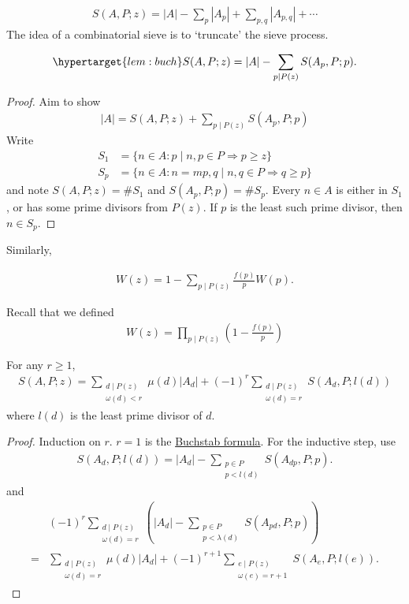 \documentclass{article}
\newcommand{\1}{\mathbbm{1}}
\begin{document}
\begin{align*}
  S(A,P;z) = |A| - \sum_p |A_p| + \sum_{p,q} |A_{p,q}| + \dotsb
\end{align*}
The idea of a combinatorial sieve is to `truncate' the sieve process.
\begin{lemma}
  \begin{equation*}
    \hypertarget{lem:buch} S(A,P;z) = |A| - \sum_{p \mid P(z)} S(A_p, P; p).
  \end{equation*}
\end{lemma}
\begin{proof}
  Aim to show
  \begin{align*}
    |A| = S(A,P;z) + \sum_{p \mid P(z)} S(A_p, P; p)
  \end{align*}
  Write
  \begin{align*}
    S_1 &= \{n \in A : p \mid n, p \in P \Rightarrow p \geq z\} \\
    S_p &= \{n \in A : n = mp, q \mid n, q \in P \Rightarrow q \geq p\}
  \end{align*}
  and note $S(A,P;z) = \# S_1$ and $S(A_p, P; p) = \# S_p$. Every $n \in A$ is either in $S_1$, or has some prime divisors from $P(z)$. If $p$ is the least such prime divisor, then $n \in S_p$.
\end{proof}
Similarly,
\begin{lemma}
  \begin{align*}
    W(z) = 1 - \sum_{p \mid P(z)} \frac{f(p)}{p} W(p).
  \end{align*}
\end{lemma}
Recall that we defined
\begin{align*}
  W(z) = \prod_{p \mid P(z)} \left(1 - \frac{f(p)}{p}\right)
\end{align*}
\begin{cor}
  For any $r \geq 1$,
  \begin{align*}
    S(A,P;z) = \sum_{\substack{d \mid P(z) \\ \omega(d) < r}} \mu(d) |A_d| + (-1)^r \sum_{\substack{d \mid P(z) \\ \omega(d) = r}} S(A_d, P; l(d))
  \end{align*}
  where $l(d)$ is the least prime divisor of $d$.
\end{cor}
\begin{proof}
  Induction on $r$. $r=1$ is the \hyperlink{lem:buch}{Buchstab formula}. For the inductive step, use
  \begin{align*}
    S(A_d, P; l(d)) = |A_d| - \sum_{\substack{p \in P \\ p < l(d)}} S(A_{dp}, P; p).
  \end{align*}
  and
  \begin{align*}
    &(-1)^r \sum_{\substack{d \mid P(z) \\ \omega(d) = r}} \left(|A_d| - \sum_{\substack{p \in P \\ p < \lambda(d)}} S(A_{pd}, P; p)\right) \\
    = & \sum_{\substack{d \mid P(z) \\ \omega(d) = r}} \mu(d) |A_d| + (-1)^{r+1} \sum_{\substack{e \mid P(z) \\ \omega(e) = r+1}} S(A_e, P; l(e)).
  \end{align*}
\end{proof}
\end{document}
